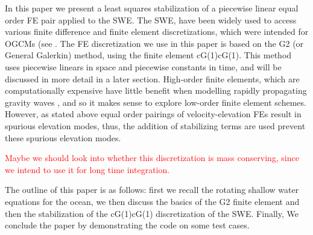 In this paper we present a least squares stabilization of a piecewise linear
equal order FE pair applied to the SWE. The SWE, have been widely used to access
various finite difference and finite element discretizations, which were
intended for OGCMs (see \cite{Batten1981,Hanert2004,Le-Roux1998,Walters1984}.
The FE discretization we use in this paper is based on the G2 (or General
Galerkin) method, using the finite element cG(1)cG(1). This method uses
piecewise linears in space and piecewise constants in time, and will be
discussed in more detail in a later section. High-order finite elements, which
are computationally expensive have little benefit when modelling rapidly
propagating gravity waves \cite{Le-Roux1998}, and so it makes sense to
explore low-order finite element schemes. However, as stated above equal
order pairings of velocity-elevation FEs result in spurious elevation modes,
thus, the addition of stabilizing terms are used prevent these spurious elevation modes. 

\textcolor{red}{Maybe we should look into whether this discretization is mass
conserving, since we intend to use it for long time integration.}

The outline of this paper is as follows: first we recall the rotating shallow
water equations for the ocean, we then discuss the basics of the G2 finite
element and then the stabilization of the cG(1)cG(1) discretization of the SWE.
Finally, We conclude the paper by demonstrating the code on some test cases.
